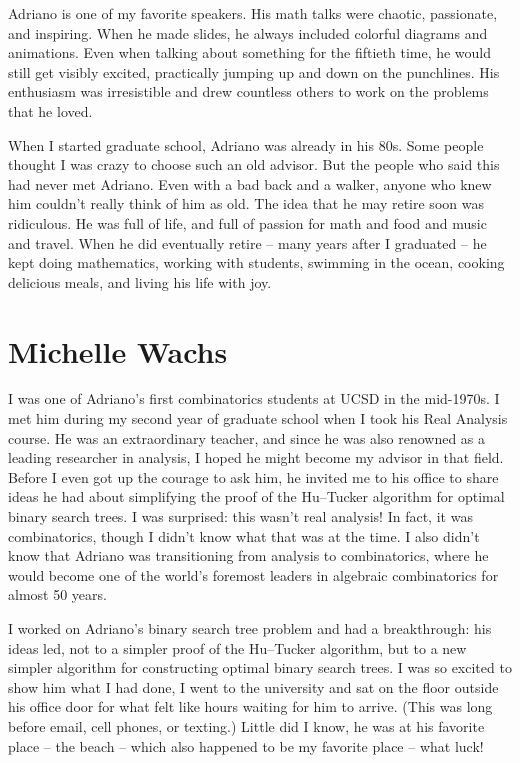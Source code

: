\documentclass{notices}
\begin{document}
Adriano is one of my favorite speakers. His math talks were chaotic, passionate, and inspiring. When he made slides, he always included colorful diagrams and animations. Even when talking about something for the fiftieth time, he would still get visibly excited, practically jumping up and down on the punchlines. His enthusiasm was irresistible and drew countless others to work on the problems that he loved.

When I started graduate school, Adriano was already in his 80s. Some people thought I was crazy to choose such an old advisor. But the people who said this had never met Adriano. Even with a bad back and a walker, anyone who knew him couldn't really think of him as old. The idea that he may retire soon was ridiculous. He was full of life, and full of passion for math and food and music and travel. When he did eventually retire – many years after I graduated – he kept doing mathematics, working with students, swimming in the ocean, cooking delicious meals, and living his life with joy.

\section*{Michelle Wachs}
I was one of Adriano's first combinatorics students at UCSD in the mid-1970s. I met him during my second year of graduate school when I took his Real Analysis course. He was an extraordinary teacher, and since he was also renowned as a leading researcher in analysis, I hoped he might become my advisor in that field.  Before I even got up the courage to ask him, he invited me to his office to share  ideas he had about simplifying the proof of the 
Hu--Tucker algorithm for optimal binary search trees. I was surprised: this wasn't real analysis! In fact, it was combinatorics, though I didn't know what that was at the time. I also didn't know that Adriano was transitioning from analysis to combinatorics, where he would become one of the world's foremost leaders in algebraic combinatorics for almost 50 years.

I worked on Adriano's binary search tree problem and had a breakthrough:  his ideas led, not to a simpler proof of the Hu--Tucker algorithm, but  to a  new simpler algorithm for constructing optimal binary search trees. 
I was so excited to show him what I had done, I went to the university and sat on the floor outside his office door for what felt like hours waiting  for him to arrive. (This was long before email, cell phones, or texting.)  Little did I know, he was at his favorite place -- the beach -- which also happened to be my favorite place -- what luck!
\end{document}
